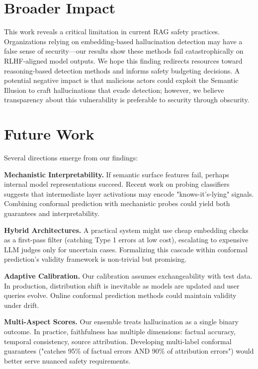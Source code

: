 \documentclass[11pt]{article}
\begin{document}
\section{Broader Impact}

This work reveals a critical limitation in current RAG safety practices. Organizations relying on embedding-based hallucination detection may have a false sense of security---our results show these methods fail catastrophically on RLHF-aligned model outputs. We hope this finding redirects resources toward reasoning-based detection methods and informs safety budgeting decisions. A potential negative impact is that malicious actors could exploit the Semantic Illusion to craft hallucinations that evade detection; however, we believe transparency about this vulnerability is preferable to security through obscurity.

\section{Future Work}

Several directions emerge from our findings:

\textbf{Mechanistic Interpretability.} If semantic surface features fail, perhaps internal model representations succeed. Recent work on probing classifiers \cite{xiang2025redeep} suggests that intermediate layer activations may encode "knows-it's-lying" signals. Combining conformal prediction with mechanistic probes could yield both guarantees and interpretability.

\textbf{Hybrid Architectures.} A practical system might use cheap embedding checks as a first-pass filter (catching Type 1 errors at low cost), escalating to expensive LLM judges only for uncertain cases. Formalizing this cascade within conformal prediction's validity framework is non-trivial but promising.

\textbf{Adaptive Calibration.} Our calibration assumes exchangeability with test data. In production, distribution shift is inevitable as models are updated and user queries evolve. Online conformal prediction methods \cite{vovk2005algorithmic} could maintain validity under drift.

\textbf{Multi-Aspect Scores.} Our ensemble treats hallucination as a single binary outcome. In practice, faithfulness has multiple dimensions: factual accuracy, temporal consistency, source attribution. Developing multi-label conformal guarantees ("catches 95\% of factual errors AND 90\% of attribution errors") would better serve nuanced safety requirements.
\end{document}
